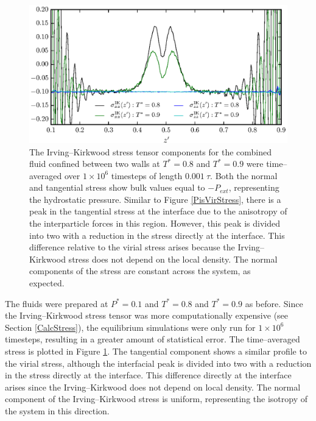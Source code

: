 \begin{figure}[h!]
\centering
\includegraphics[scale=1.0]{PisIKStress}
\caption{The Irving--Kirkwood stress tensor components for the combined fluid confined between two walls at $T^{*} = 0.8$ and $T^{*} = 0.9$ were time--averaged over $1 \times 10^{6}$ timesteps of length $0.001\ \tau$.
Both the normal and tangential stress show bulk values equal to $-P_{ext}$, representing the hydrostatic pressure.
Similar to Figure \ref{PisVirStress}, there is a peak in the tangential stress at the interface due to the anisotropy of the interparticle forces in this region.
However, this peak is divided into two with a reduction in the stress directly at the interface.
This difference relative to the virial stress arises because the Irving--Kirkwood stress does not depend on the local density. 
The normal components of the stress are constant across the system, as expected.
}
\label{PisIKStress}
\end{figure}
\FloatBarrier 
The fluids were prepared at $P^{*}=0.1$ and $T^{*}=0.8$ and $T^{*}=0.9$ as before.
Since the Irving--Kirkwood stress tensor was more computationally expensive (see Section \ref{CalcStress}), the equilibrium simulations were only run for $1 \times 10^{6}$ timesteps, resulting in a greater amount of statistical error.
The time--averaged stress is plotted in Figure \ref{PisIKStress}.
The tangential component shows a similar profile to the virial stress, although the interfacial peak is divided into two with a reduction in the stress directly at the interface.
This difference directly at the interface arises since the Irving--Kirkwood does not depend on local density.
The normal component of the Irving--Kirkwood stress is uniform, representing the isotropy of the system in this direction.
\FloatBarrier

